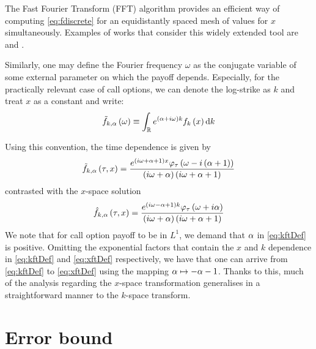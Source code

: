 \documentclass[11pt]{amsart}
\begin{document}
The Fast Fourier Transform (FFT) algorithm provides an efficient 
way of computing \eqref{eq:fdiscrete} for an equidistantly
spaced mesh of values for $x$ simultaneously.
Examples of works that consider this widely extended tool are \cite{lord2008fast,jackson2008fourier,hurd2010fourier} and \cite{schmelzle2010option}.

Similarly, one may define the Fourier frequency $\omega$
as the conjugate variable of some external parameter on which
the payoff depends. Especially, for the practically relevant case
of call options, we can denote the log-strike as $k$ and treat
$x$ as a constant and write:
\begin{align}
\tilde{f}_{k,\alpha} \left( {\omega} \right) \equiv
\int_{\mathbb{R}} e^{\left( {\alpha +i \omega } \right)k } f_k \left( {x} \right) \textrm{d} k
\end{align}

Using this convention, the time dependence is given by
\begin{align}
\label{eq:kftDef}
\tilde{f}_{k,\alpha} \left( {\tau,x} \right) = 
\frac{e^{\left( {i \omega + \alpha + 1} \right) x} \varphi_{\tau} \left( {{\omega - i \left( {\alpha +1} \right) }} \right)}{\left( {i \omega + \alpha} \right) \left( {i \omega + \alpha + 1} \right)}
\end{align}
contrasted with the $x$-space solution
\begin{align}
\label{eq:xftDef}
\hat{f}_{k,\alpha} \left( {\tau,x} \right) = 
\frac{e^{\left( {i \omega - \alpha + 1} \right) k} \varphi_{\tau} \left( {{\omega + i \alpha }} \right)}{\left( {i \omega + \alpha} \right) \left( {i \omega + \alpha + 1} \right)}
\end{align}
We note that for call option payoff to be in $L^1$,
we demand that $\alpha$ in \eqref{eq:kftDef} is positive.
Omitting the exponential factors that contain the $x$ and $k$
dependence in \eqref{eq:kftDef} and \eqref{eq:xftDef} respectively,
we have that one can arrive from \eqref{eq:kftDef} to \eqref{eq:xftDef}
using the mapping $\alpha \mapsto -\alpha-1 $. Thanks to this,
much of the analysis regarding the $x$-space transformation
generalises in a straightforward manner to the $k$-space transform.

\section{Error bound}
\label{section:Bound}
\end{document}
